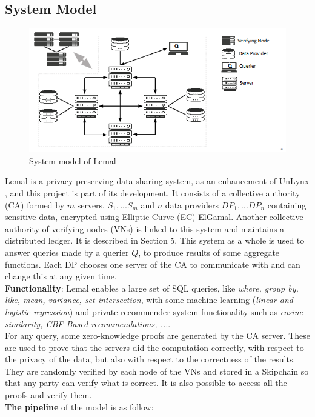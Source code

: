 \documentclass{article}
\begin{document}
\subsection{System Model}
\begin{figure}[H]
\center
\includegraphics[scale=0.75]{img/lemal.png}
\caption{System model of Lemal}
\end{figure}
Lemal is a privacy-preserving data sharing system, as an enhancement of UnLynx \cite{unlynx}, and this project is part of its development. It consists of a collective authority (CA) formed by $m$ servers, $S_1,...S_m$ and $n$ data providers $DP_1,...DP_n$ containing sensitive data, encrypted using Elliptic Curve (EC) ElGamal.
Another collective authority of verifying nodes (VNs) is linked to this system and maintains a distributed ledger. It is described in Section 5. This system as a whole is used to answer queries made by a querier $Q$, to produce results of some aggregate functions. Each DP chooses one server of the CA to communicate with and can change this at any given time.\\
\textbf{Functionality}: Lemal enables a large set of SQL queries, like \textit{where, group by, like, mean, variance, set intersection}, with some machine learning (\textit{linear and logistic regression}) and private recommender system functionality such as \textit{cosine similarity, CBF-Based recommendations, ...}.\\
For any query, some zero-knowledge proofs are generated by the CA server. These are used to prove that the servers did the computation correctly, with respect to the privacy of the data, but also with respect to the correctness of the results. They are randomly verified by each node of the VNs and stored in a Skipchain so that any party can verify what is correct. It is also possible to access all the proofs and verify them.\\
\textbf{The pipeline} of the model is as follow:
\end{document}
